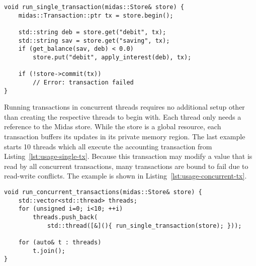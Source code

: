 \begin{lstlisting}[caption={A single transaction on account data.},captionpos=b, label=lst:usage-single-tx]
void run_single_transaction(midas::Store& store) {
    midas::Transaction::ptr tx = store.begin();

    std::string deb = store.get("debit", tx);
    std::string sav = store.get("saving", tx);
    if (get_balance(sav, deb) < 0.0)
        store.put("debit", apply_interest(deb), tx);

    if (!store->commit(tx))
        // Error: transaction failed
}
\end{lstlisting}

Running transactions in concurrent threads requires no additional setup other
than creating the respective threads to begin with. Each thread only needs a
reference to the Midas store. While the store is a global resource, each
transaction buffers its updates in its private memory region. The last example
starts 10 threads which all execute the accounting transaction from
Listing~\ref{lst:usage-single-tx}. Because this transaction may modify a value
that is read by all concurrent transactions, many transactions are bound to fail
due to read-write conflicts. The example is shown in
Listing~\ref{lst:usage-concurrent-tx}.

\begin{lstlisting}[caption={Several concurrent accounting transactions on the same store.},captionpos=b, label=lst:usage-concurrent-tx]
void run_concurrent_transactions(midas::Store& store) {
    std::vector<std::thread> threads;
    for (unsigned i=0; i<10; ++i)
        threads.push_back(
            std::thread([&](){ run_single_transaction(store); }));

    for (auto& t : threads)
        t.join();
}
\end{lstlisting}
